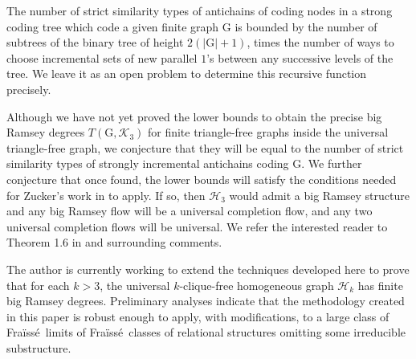 \documentclass{amsart}
\theoremstyle{remark}
\theoremstyle{definition}
\theoremstyle{remark}
\newcommand{\bT}{\mathbb{T}}
\newcommand{\G}{\mathrm{G}}
\newcommand{\HH}{\mathrm{H}}
\newcommand{\Nesetril}{Ne{\v{s}}et{\v{r}}il}
\newcommand{\Rodl}{R{\"{o}}dl}
\newcommand{\Fraisse}{Fra{\"{i}}ss{\'{e}}}
\begin{document}
The number   of strict similarity types of antichains of coding nodes in a strong coding tree
which code
 a given finite graph $\G$
is bounded by the number of subtrees of the binary tree of height $2(|\G|+1)$,
times the number of ways to choose incremental sets of new parallel $1$'s between any successive levels of the tree.
We leave it as an open problem to determine this recursive function precisely.


Although we have not yet proved the lower bounds
to obtain the precise
 big Ramsey degrees  $T(\G,\mathcal{K}_3)$ for finite triangle-free graphs inside the universal triangle-free graph, we conjecture that they will be equal to the number of strict similarity
 types of  strongly
incremental
antichains  coding $\G$.
We further conjecture that once found, the lower bounds will satisfy the conditions   needed for  Zucker's work in \cite{Zucker19} to apply.
If  so, then  $\mathcal{H}_3$ would admit a big Ramsey structure and  any big Ramsey flow will be a universal completion flow, and any two universal completion flows will be universal.
We refer the interested reader to
Theorem 1.6 in \cite{Zucker19} and surrounding comments.









The author is currently working to extend
the techniques developed here to prove that for each $k>3$,
the universal $k$-clique-free homogeneous graph $\mathcal{H}_k$ has finite big Ramsey degrees.
Preliminary analyses indicate that the
methodology
created in this paper is robust enough
 to  apply, with  modifications,  to a large class of \Fraisse\ limits of \Fraisse\ classes of relational structures omitting some irreducible substructure.













\end{document}
